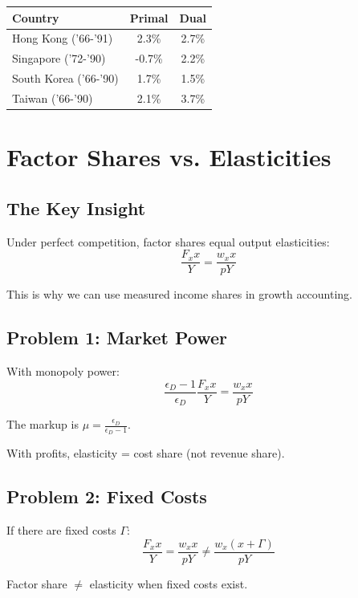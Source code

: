 \documentclass[a4paper,11pt]{article}
\begin{document}
\begin{center}
\begin{tabular}{lcc}
\toprule
Country & Primal & Dual \\
\midrule
Hong Kong ('66-'91) & 2.3\% & 2.7\% \\
Singapore ('72-'90) & -0.7\% & 2.2\% \\
South Korea ('66-'90) & 1.7\% & 1.5\% \\
Taiwan ('66-'90) & 2.1\% & 3.7\% \\
\bottomrule
\end{tabular}
\end{center}

\section{Factor Shares vs. Elasticities}

\subsection*{The Key Insight}

Under perfect competition, factor shares equal output elasticities:
\[
\frac{F_x x}{Y} = \frac{w_x x}{pY}
\tag{Share-Elasticity}
\]

This is why we can use measured income shares in growth accounting.

\subsection*{Problem 1: Market Power}

With monopoly power:
\[
\frac{\epsilon_D - 1}{\epsilon_D} \frac{F_x x}{Y} = \frac{w_x x}{pY}
\tag{Market-Power}
\]

The markup is $\mu = \frac{\epsilon_D}{\epsilon_D - 1}$.

With profits, elasticity = cost share (not revenue share).

\subsection*{Problem 2: Fixed Costs}

If there are fixed costs $\Gamma$:
\[
\frac{F_x x}{Y} = \frac{w_x x}{pY} \neq \frac{w_x(x+\Gamma)}{pY}
\tag{Fixed-Costs}
\]

Factor share $\neq$ elasticity when fixed costs exist.
\end{document}
